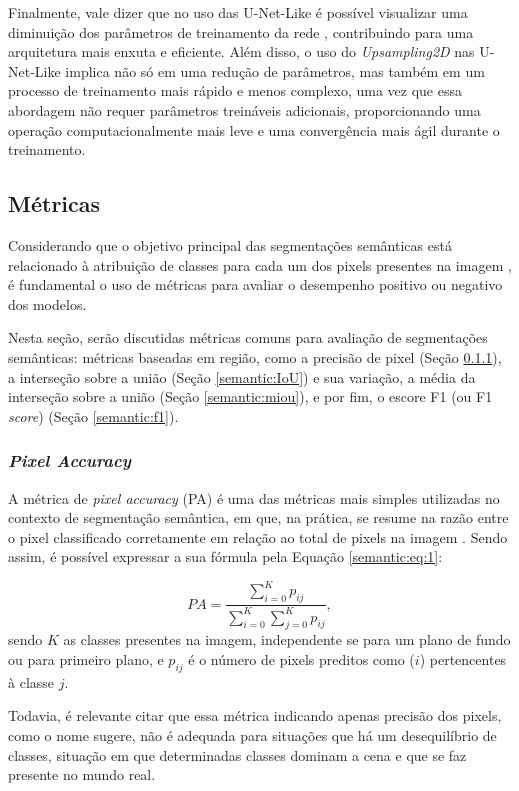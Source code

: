 Finalmente, vale dizer que no uso das U-Net-Like é possível visualizar uma diminuição dos parâmetros de treinamento da rede \citep{Pfister2019AutomatedNetworks}, contribuindo para uma arquitetura mais enxuta e eficiente. Além disso, o uso do \textit{Upsampling2D} nas U-Net-Like implica não só em uma redução de parâmetros, mas também em um processo de treinamento mais rápido e menos complexo, uma vez que essa abordagem não requer parâmetros treináveis adicionais, proporcionando uma operação computacionalmente mais leve e uma convergência mais ágil durante o treinamento.

\subsection{Métricas}
\label{semantic:metrics}
Considerando que o objetivo principal das segmentações semânticas está relacionado à atribuição de classes para cada um dos pixels presentes na imagem \citep{Csurka2013}, é fundamental o uso de métricas para avaliar o desempenho positivo ou negativo dos modelos.

Nesta seção, serão discutidas métricas comuns para avaliação de segmentações semânticas: métricas baseadas em região, como a precisão de pixel (Seção \ref{semantic:pa}), a interseção sobre a união (Seção \ref{semantic:IoU}) e sua variação, a média da interseção sobre a união (Seção \ref{semantic:miou}), e por fim, o escore F1 (ou F1 \textit{score}) (Seção \ref{semantic:f1}).


\subsubsection{\textit{Pixel Accuracy}}
\label{semantic:pa}
A métrica de \textit{pixel accuracy} (PA) é uma das métricas mais simples utilizadas no contexto de segmentação semântica, em que, na prática, se resume na razão entre o pixel classificado corretamente em relação ao total de pixels na imagem \citep{Minaee2021}. Sendo assim, é possível expressar a sua fórmula pela Equação \ref{semantic:eq:1}:

\begin{equation}
    \label{semantic:eq:1}
    PA = \frac{\sum_{i=0}^{K} p_{ij}}{\sum_{i=0}^{K} \sum_{j=0}^{K} p_{ij}},
\end{equation}
sendo $K$ as classes presentes na imagem, independente se para um plano de fundo ou para primeiro plano, e $p_{ij}$ é o número de pixels preditos como ($i$) pertencentes à classe $j$.

Todavia, é relevante citar que essa métrica indicando apenas precisão dos pixels, como o nome sugere, não é adequada para situações que há um desequilíbrio de classes, situação em que determinadas classes dominam a cena e que se faz presente no mundo real.


